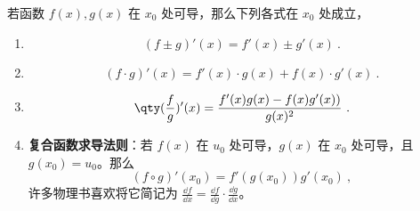 

若函数 $f(x),g(x)$ 在 $x_0$ 处可导，那么下列各式在 $x_0$ 处成立，

\begin{enumerate}
\item 
\begin{equation}
(f\pm g)'(x)=f'(x)\pm g'(x)~.
\end{equation}
\item 
\begin{equation}
(f\cdot g)'(x)=f'(x)\cdot g(x)+f(x)\cdot g'(x)~.
\end{equation}
\item 
\begin{equation}
\qty(\frac{f}{g})'(x)=\frac{f'(x)g(x)-f(x)g'(x))}{g(x)^2}~.
\end{equation}
\item \textbf{复合函数求导法则}：若 $f(x)$ 在 $u_0$ 处可导，$g(x)$ 在 $x_0$ 处可导，且 $g(x_0)=u_0$。那么 
\begin{equation}
(f\circ g)'(x_0)=f'(g(x_0))g'(x_0)~,
\end{equation}
许多物理书喜欢将它简记为 $\frac{\dd f}{\dd x}=\frac{\dd f}{\dd g} \cdot \frac{\dd g}{\dd x}$。
\end{enumerate}


